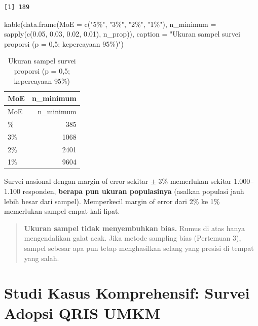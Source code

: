 \documentclass[
  indonesian,
  letterpaper,
]{book}
\newenvironment{Shaded}{\begin{snugshade}}{\end{snugshade}}
\newcommand{\AttributeTok}[1]{\textcolor[rgb]{0.40,0.45,0.13}{#1}}
\newcommand{\FloatTok}[1]{\textcolor[rgb]{0.68,0.00,0.00}{#1}}
\newcommand{\FunctionTok}[1]{\textcolor[rgb]{0.28,0.35,0.67}{#1}}
\newcommand{\NormalTok}[1]{\textcolor[rgb]{0.00,0.23,0.31}{#1}}
\newcommand{\StringTok}[1]{\textcolor[rgb]{0.13,0.47,0.30}{#1}}
\begin{document}
\begin{verbatim}
[1] 189
\end{verbatim}

\begin{Shaded}
\begin{Highlighting}[]
\FunctionTok{kable}\NormalTok{(}\FunctionTok{data.frame}\NormalTok{(}\AttributeTok{MoE =} \FunctionTok{c}\NormalTok{(}\StringTok{"5\%"}\NormalTok{, }\StringTok{"3\%"}\NormalTok{, }\StringTok{"2\%"}\NormalTok{, }\StringTok{"1\%"}\NormalTok{),}
                 \AttributeTok{n\_minimum =} \FunctionTok{sapply}\NormalTok{(}\FunctionTok{c}\NormalTok{(}\FloatTok{0.05}\NormalTok{, }\FloatTok{0.03}\NormalTok{, }\FloatTok{0.02}\NormalTok{, }\FloatTok{0.01}\NormalTok{), n\_prop)),}
      \AttributeTok{caption =} \StringTok{"Ukuran sampel survei proporsi (p = 0,5; kepercayaan 95\%)"}\NormalTok{)}
\end{Highlighting}
\end{Shaded}

\begin{longtable}[]{@{}lr@{}}
\caption{Ukuran sampel survei proporsi (p = 0,5; kepercayaan
95\%)}\tabularnewline
\toprule\noalign{}
MoE & n\_minimum \\
\midrule\noalign{}
\endfirsthead
\toprule\noalign{}
MoE & n\_minimum \\
\midrule\noalign{}
\endhead
\bottomrule\noalign{}
\endlastfoot
5\% & 385 \\
3\% & 1068 \\
2\% & 2401 \\
1\% & 9604 \\
\end{longtable}

Survei nasional dengan margin of error sekitar \(\pm\) 3\% memerlukan
sekitar 1.000--1.100 responden, \textbf{berapa pun ukuran populasinya}
(asalkan populasi jauh lebih besar dari sampel). Memperkecil margin of
error dari 2\% ke 1\% memerlukan sampel empat kali lipat.

\begin{quote}
\textbf{Ukuran sampel tidak menyembuhkan bias.} Rumus di atas hanya
mengendalikan galat acak. Jika metode sampling bias (Pertemuan 3),
sampel sebesar apa pun tetap menghasilkan selang yang presisi di tempat
yang salah.
\end{quote}

\section{Studi Kasus Komprehensif: Survei Adopsi QRIS
UMKM}\label{studi-kasus-komprehensif-survei-adopsi-qris-umkm}
\end{document}
